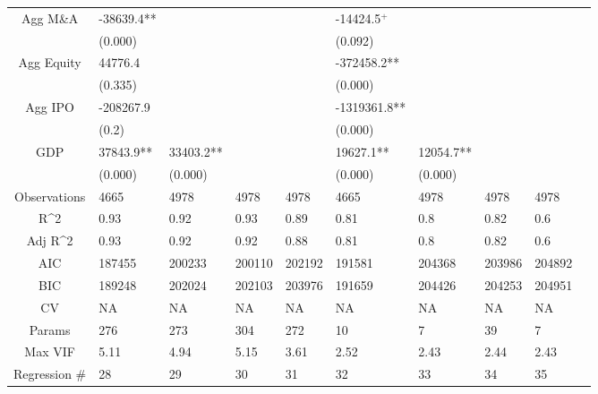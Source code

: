 \documentclass{article}
\begin{document}
\begin{table}[H]
\begin{tabular}{|clllllllll|}
  Agg M\&A & -38639.4** &  &  &  & -14424.5$^{+}$ &  &  &  & \\ 
   & (0.000) &  &  &  & (0.092) &  &  &  & \\ 
  Agg Equity & 44776.4 &  &  &  & -372458.2** &  &  &  & \\ 
   & (0.335) &  &  &  & (0.000) &  &  &  & \\ 
  Agg IPO & -208267.9 &  &  &  & -1319361.8** &  &  &  & \\ 
   & (0.2) &  &  &  & (0.000) &  &  &  & \\ 
  GDP & 37843.9** & 33403.2** &  &  & 19627.1** & 12054.7** &  &  & \\ 
   & (0.000) & (0.000) &  &  & (0.000) & (0.000) &  &  & \\ 
  \hline 
 Observations & 4665 & 4978 & 4978 & 4978 & 4665 & 4978 & 4978 & 4978 & \\ 
  R^2 & 0.93 & 0.92 & 0.93 & 0.89 & 0.81 & 0.8 & 0.82 & 0.6 & \\ 
  Adj R^2 & 0.93 & 0.92 & 0.92 & 0.88 & 0.81 & 0.8 & 0.82 & 0.6 & \\ 
  AIC & 187455 & 200233 & 200110 & 202192 & 191581 & 204368 & 203986 & 204892 & \\ 
  BIC & 189248 & 202024 & 202103 & 203976 & 191659 & 204426 & 204253 & 204951 & \\ 
  CV & NA & NA & NA & NA & NA & NA & NA & NA & \\ 
  Params & 276 & 273 & 304 & 272 & 10 & 7 & 39 & 7 & \\ 
  Max VIF & 5.11 & 4.94 & 5.15 & 3.61 & 2.52 & 2.43 & 2.44 & 2.43 & \\ 
  Regression \# & 28 & 29 & 30 & 31 & 32 & 33 & 34 & 35 & \\ 
   \hline
\end{tabular}
 
\end{table}
\end{document}
